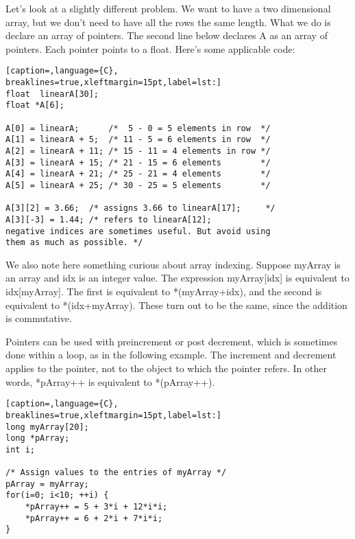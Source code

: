 Let's look at a slightly different problem. We want to have a two dimensional
array, but we don't need to have all the rows the same length. What we do is
declare an array of pointers. The second line below declares A as an array of
pointers. Each pointer points to a float. Here's some applicable code:
\lstset{basicstyle=\scriptsize, numbers=left, captionpos=b, tabsize=4}
\begin{lstlisting}[caption=,language={C},
breaklines=true,xleftmargin=15pt,label=lst:]
float  linearA[30];
float *A[6];

A[0] = linearA;      /*  5 - 0 = 5 elements in row  */
A[1] = linearA + 5;  /* 11 - 5 = 6 elements in row  */
A[2] = linearA + 11; /* 15 - 11 = 4 elements in row */
A[3] = linearA + 15; /* 21 - 15 = 6 elements        */
A[4] = linearA + 21; /* 25 - 21 = 4 elements        */
A[5] = linearA + 25; /* 30 - 25 = 5 elements        */

A[3][2] = 3.66;  /* assigns 3.66 to linearA[17];     */
A[3][-3] = 1.44; /* refers to linearA[12];           
negative indices are sometimes useful. But avoid using 
them as much as possible. */
\end{lstlisting}

We also note here something curious about array indexing. Suppose myArray is an
array and idx is an integer value. The expression myArray[idx] is equivalent to
idx[myArray]. The first is equivalent to *(myArray+idx), and the second is
equivalent to *(idx+myArray). These turn out to be the same, since the addition
is commutative.

Pointers can be used with preincrement or post decrement, which is sometimes
done within a loop, as in the following example. The increment and decrement
applies to the pointer, not to the object to which the pointer refers.  In
other words, *pArray++ is equivalent to *(pArray++).
\lstset{basicstyle=\scriptsize, numbers=left, captionpos=b, tabsize=4}
\begin{lstlisting}[caption=,language={C},
breaklines=true,xleftmargin=15pt,label=lst:]
long myArray[20];
long *pArray;
int i;

/* Assign values to the entries of myArray */
pArray = myArray;
for(i=0; i<10; ++i) {
	*pArray++ = 5 + 3*i + 12*i*i;
	*pArray++ = 6 + 2*i + 7*i*i;
}
\end{lstlisting}

